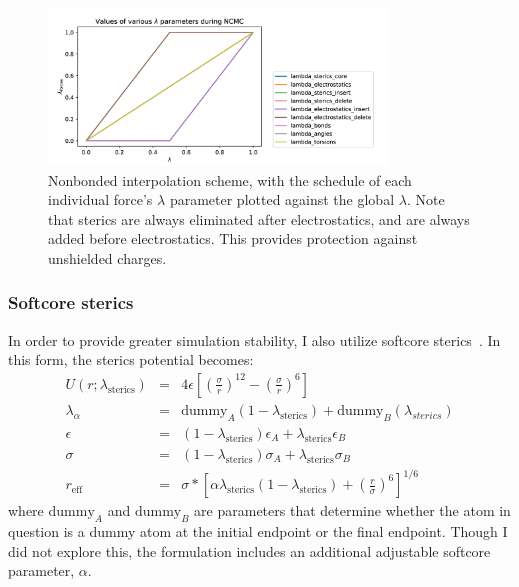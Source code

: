 \begin{figure}
    \centering
    \includegraphics[width=0.8\textwidth]{lambda_traj_plotvec2-fixed.png}
    \caption{Nonbonded interpolation scheme, with the schedule of each individual force's $\lambda$ parameter plotted against the global $\lambda$. Note that sterics are always eliminated after electrostatics, and are always added before electrostatics. This provides protection against unshielded charges.}
    \label{fig:nb_interpolation}
\end{figure}
%
\subsubsection{Softcore sterics}
%
In order to provide greater simulation stability, I also utilize softcore sterics~\cite{Hornak2004}.
%
In this form, the sterics potential becomes:
\begin{eqnarray}
    U(r; \lambda_\mathrm{sterics}) &=& 4\epsilon\left[ \left(\frac{\sigma}{r}\right)^{12} - \left(\frac{\sigma}{r}\right)^6\right] \\
    \lambda_{\alpha} &=& \mathrm{dummy}_A (1-\lambda_\mathrm{sterics}) + \mathrm{dummy}_B (\lambda_{sterics}) \\
    \epsilon &=& (1 - \lambda_\mathrm{sterics}) \epsilon_A + \lambda_\mathrm{sterics} \epsilon_B \\
    \sigma &=& (1 - \lambda_\mathrm{sterics}) \sigma_A + \lambda_\mathrm{sterics} \sigma_B \\
    r_\mathrm{eff} &=& \sigma * \left[\alpha \lambda_\mathrm{sterics} (1 - \lambda_\mathrm{sterics}) + \left(\frac{r}{\sigma}\right)^6\right]^{1/6}
\end{eqnarray}
%
\noindent where $\mathrm{dummy}_A$ and $\mathrm{dummy}_B$ are parameters that determine whether the atom in question is a dummy atom at the initial endpoint or the final endpoint.
%
Though I did not explore this, the formulation includes an additional adjustable softcore parameter, $\alpha$. 
%
